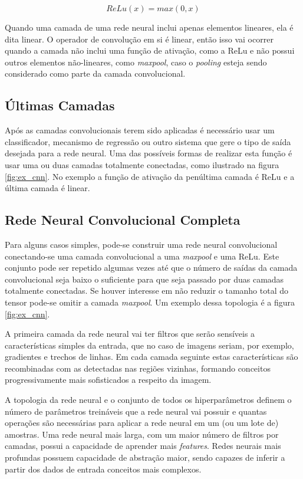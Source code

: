\begin{equation}
	ReLu(x) = max(0,x)
\end{equation}

Quando uma camada de uma rede neural inclui apenas elementos lineares,
ela é dita linear. O operador de convolução em si é linear, então
isso vai ocorrer quando a camada não inclui uma função de ativação, como
a ReLu e não possui outros elementos não-lineares, como \emph{maxpool},
caso o \emph{pooling} esteja sendo considerado como parte da camada
convolucional.

\subsection{Últimas Camadas}
Após as camadas convolucionais terem sido aplicadas é necessário usar um
classificador, mecanismo de regressão ou outro sistema que gere o tipo de saída
desejada para a rede neural. Uma das possíveis formas de realizar esta função é
usar uma ou duas camadas totalmente conectadas, como ilustrado na figura
\ref{fig:ex_cnn}. No exemplo a função de ativação da penúltima camada é
ReLu e a última camada é linear.

\subsection{Rede Neural Convolucional Completa}
Para alguns casos simples, pode-se construir uma rede neural convolucional
conectando-se uma camada convolucional a uma \emph{maxpool} e uma ReLu. Este
conjunto pode ser repetido algumas vezes até que o número de saídas da camada
convolucional seja baixo o suficiente para que seja passado por duas camadas
totalmente conectadas. Se houver interesse em não reduzir o tamanho total do
tensor pode-se omitir a camada \emph{maxpool}. Um exemplo dessa topologia é a
figura \ref{fig:ex_cnn}.

A primeira camada da rede neural vai ter filtros que serão sensíveis a
características simples da entrada, que no caso de imagens seriam, por exemplo,
gradientes e trechos de linhas. Em
cada camada seguinte estas características são recombinadas com as detectadas
nas regiões vizinhas, formando conceitos progressivamente mais sofisticados a
respeito da imagem.

A topologia da rede neural e o conjunto de todos os hiperparâmetros definem o
número de parâmetros treináveis que a rede neural vai possuir e quantas
operações são necessárias para aplicar a rede neural em um (ou um lote de)
amostras. Uma rede neural mais larga, com um maior número de filtros por
camadas, possui a capacidade de aprender mais \emph{features}. Redes neurais
mais profundas possuem capacidade de abstração maior, sendo capazes de inferir
a partir dos dados de entrada conceitos mais complexos.

